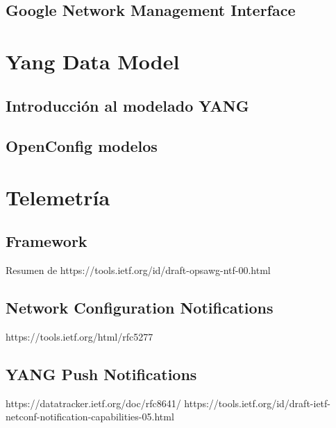 \subsection{Google Network Management Interface\label{sec:gNMI}}

\section{Yang Data Model}

\subsection{Introducción al modelado YANG}

\subsection{OpenConfig modelos}

\section{Telemetría}

\subsection{Framework}

Resumen de
https://tools.ietf.org/id/draft-opsawg-ntf-00.html

\subsection{Network Configuration Notifications\label{sec:NETCONFNot}}

https://tools.ietf.org/html/rfc5277

\subsection{YANG Push Notifications\label{sec:YANGNot}}

https://datatracker.ietf.org/doc/rfc8641/
https://tools.ietf.org/id/draft-ietf-netconf-notification-capabilities-05.html
